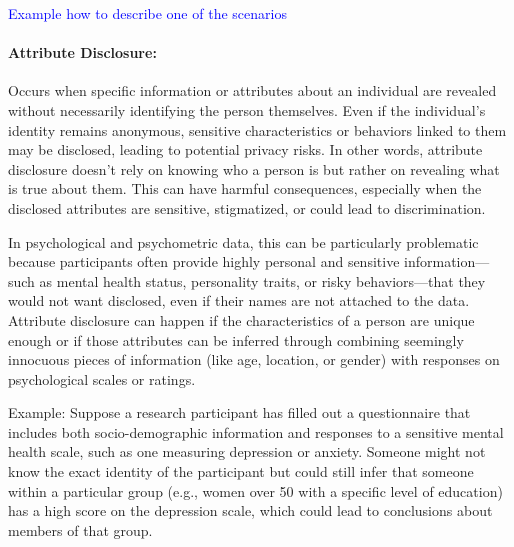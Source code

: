 \documentclass{article}
\begin{document}
\textcolor{blue}{Example how to describe one of the scenarios}
\color{red}
\paragraph{Attribute Disclosure:} Occurs when specific information or attributes about an individual are revealed without necessarily identifying the person themselves. Even if the individual’s identity remains anonymous, sensitive characteristics or behaviors linked to them may be disclosed, leading to potential privacy risks. In other words, attribute disclosure doesn’t rely on knowing who a person is but rather on revealing what is true about them. This can have harmful consequences, especially when the disclosed attributes are sensitive, stigmatized, or could lead to discrimination.

In psychological and psychometric data, this can be particularly problematic because participants often provide highly personal and sensitive information—such as mental health status, personality traits, or risky behaviors—that they would not want disclosed, even if their names are not attached to the data. Attribute disclosure can happen if the characteristics of a person are unique enough or if those attributes can be inferred through combining seemingly innocuous pieces of information (like age, location, or gender) with responses on psychological scales or ratings.

Example: 
Suppose a research participant has filled out a questionnaire that includes both socio-demographic information and responses to a sensitive mental health scale, such as one measuring depression or anxiety. Someone might not know the exact identity of the participant but could still infer that someone within a particular group (e.g., women over 50 with a specific level of education) has a high score on the depression scale, which could lead to conclusions about members of that group.
\end{document}
